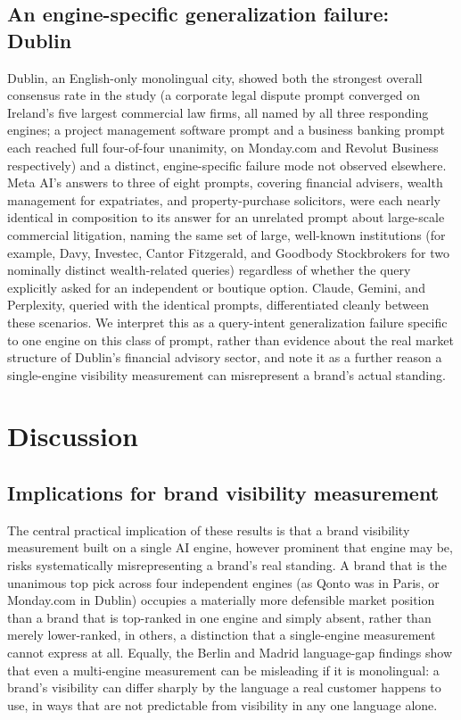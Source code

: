 \documentclass[11pt]{article}
\begin{document}
\subsection{An engine-specific generalization failure: Dublin}

Dublin, an English-only monolingual city, showed both the strongest overall consensus
rate in the study (a corporate legal dispute prompt converged on Ireland's five largest
commercial law firms, all named by all three responding engines; a project management
software prompt and a business banking prompt each reached full four-of-four unanimity,
on Monday.com and Revolut Business respectively) and a distinct, engine-specific
failure mode not observed elsewhere. Meta AI's answers to three of eight prompts,
covering financial advisers, wealth management for expatriates, and property-purchase
solicitors, were each nearly identical in composition to its answer for an unrelated
prompt about large-scale commercial litigation, naming the same set of large,
well-known institutions (for example, Davy, Investec, Cantor Fitzgerald, and Goodbody
Stockbrokers for two nominally distinct wealth-related queries) regardless of whether
the query explicitly asked for an independent or boutique option. Claude, Gemini, and
Perplexity, queried with the identical prompts, differentiated cleanly between these
scenarios. We interpret this as a query-intent generalization failure specific to one
engine on this class of prompt, rather than evidence about the real market structure of
Dublin's financial advisory sector, and note it as a further reason a single-engine
visibility measurement can misrepresent a brand's actual standing.

\section{Discussion}

\subsection{Implications for brand visibility measurement}

The central practical implication of these results is that a brand visibility
measurement built on a single AI engine, however prominent that engine may be, risks
systematically misrepresenting a brand's real standing. A brand that is the unanimous
top pick across four independent engines (as Qonto was in Paris, or Monday.com in
Dublin) occupies a materially more defensible market position than a brand that is
top-ranked in one engine and simply absent, rather than merely lower-ranked, in others,
a distinction that a single-engine measurement cannot express at all. Equally, the
Berlin and Madrid language-gap findings show that even a multi-engine measurement can be
misleading if it is monolingual: a brand's visibility can differ sharply by the
language a real customer happens to use, in ways that are not predictable from
visibility in any one language alone.
\end{document}
